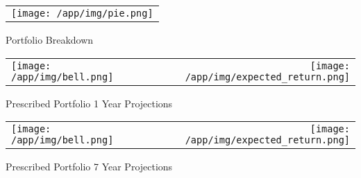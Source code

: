 \documentclass{article}
\begin{document}
\begin{adjustwidth}{-.3in}{0in}%
\vspace*{-1cm}

\begin{center}
  \begin{tabular}{c}
    \texttt{[image: /app/img/pie.png]}
  \end{tabular}
  \end{center}

  \begin{center}
        Portfolio Breakdown
  \end{center}

\vspace{.7cm}


\begin{center}
  \begin{tabular}{lcr}
  \texttt{[image: /app/img/bell.png]}
    & \hspace{1cm }&\texttt{[image: /app/img/expected\_return.png]}
  \end{tabular}
  \end{center}

  \begin{center}
      Prescribed Portfolio 1 Year Projections
  \end{center}

  \vspace{.7cm}


\begin{center}
  \begin{tabular}{lcr}
  \texttt{[image: /app/img/bell.png]}
    & \hspace{1cm }&\texttt{[image: /app/img/expected\_return.png]}
  \end{tabular}
  \end{center}

  \begin{center}
      Prescribed Portfolio 7 Year Projections
  \end{center}

\vspace{.6cm}

\end{adjustwidth}
\end{document}
